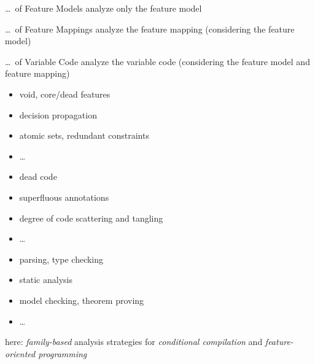\begin{frame}{\myframetitle}
	\begin{mycolumns}[t,columns=3]
		\textbf{\lecturemodeling\partc}
		\begin{definition}{\ldots\ of Feature Models}
			analyze only the feature model
		\end{definition}
	\mynextcolumn
		\textbf{\lectureanalyses\partb}
		\begin{definition}{\ldots\ of Feature Mappings}
			analyze the feature mapping (considering the feature model)
		\end{definition}
	\mynextcolumn
		\textbf{\lectureanalyses\partc}
		\begin{definition}{\ldots\ of Variable Code}
			analyze the variable code (considering the feature model and feature mapping)
		\end{definition}
	\end{mycolumns}
	\begin{mycolumns}[t,columns=3]
		\begin{example}{}
			\begin{itemize}
				\item void, core/dead features
				\item decision propagation
				\item atomic sets, redundant constraints
				\item \ldots
			\end{itemize}
		\end{example}
	\mynextcolumn
		\begin{example}{}
			\begin{itemize}
				\item dead code
				\item superfluous annotations
				\item degree of code scattering and tangling
				\item \ldots
			\end{itemize}
		\end{example}
	\mynextcolumn
		\begin{example}{}
			\begin{itemize}
				\item parsing, type checking
				\item static analysis
				\item model checking, theorem proving
				\item \ldots
			\end{itemize}
		\end{example}
	\end{mycolumns}
	\begin{mycolumns}[t,columns=2,widths={32}]
	\mynextcolumn
		\begin{note}{}
			here: \emph{family-based} analysis strategies for \emph{conditional compilation} and \emph{feature-oriented programming}
		\end{note}
	\end{mycolumns}
\end{frame}